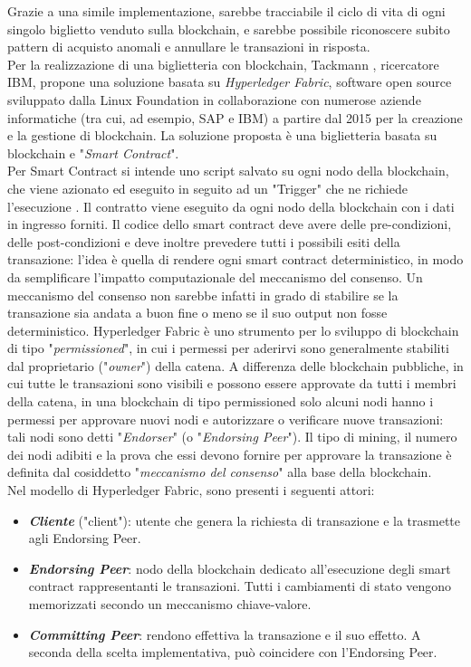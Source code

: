 Grazie a una simile implementazione, sarebbe tracciabile il ciclo di vita di ogni singolo biglietto venduto sulla blockchain, e sarebbe possibile riconoscere subito pattern di acquisto anomali e annullare le transazioni in risposta. \\
Per la realizzazione di una biglietteria con blockchain, Tackmann \cite{tackmann2017secure}, ricercatore IBM, propone una soluzione basata su \emph{Hyperledger Fabric}, software open source sviluppato dalla Linux Foundation in collaborazione con numerose aziende informatiche (tra cui, ad esempio, SAP e IBM) a partire dal 2015 per la creazione e la gestione di blockchain. La soluzione proposta è una biglietteria basata su blockchain e "\textit{Smart Contract}". \\ 
Per Smart Contract si intende uno script salvato su ogni nodo della blockchain, che viene azionato ed eseguito in seguito ad un "Trigger" che ne richiede l'esecuzione \cite{christidis2016blockchains}. Il contratto viene eseguito da ogni nodo della blockchain con i dati in ingresso forniti. Il codice dello smart contract deve avere delle pre-condizioni, delle post-condizioni e deve inoltre prevedere tutti i possibili esiti della transazione: l'idea è quella di rendere ogni smart contract deterministico, in modo da semplificare l'impatto computazionale del meccanismo del consenso. Un meccanismo del consenso non sarebbe infatti in grado di stabilire se la transazione sia andata a buon fine o meno se il suo output non fosse deterministico.
Hyperledger Fabric è uno strumento per lo sviluppo di blockchain di tipo "\textit{permissioned}", in cui i permessi per aderirvi sono generalmente stabiliti dal proprietario ("\textit{owner}") della catena. A differenza delle blockchain pubbliche, in cui tutte le transazioni sono visibili e possono essere approvate da tutti i membri della catena, in una blockchain di tipo permissioned solo alcuni nodi hanno i permessi per approvare nuovi nodi e autorizzare o verificare nuove transazioni: tali nodi sono detti "\textit{Endorser}" (o "\textit{Endorsing Peer}"). Il tipo di mining, il numero dei nodi adibiti e la prova che essi devono fornire per approvare la transazione è definita dal cosiddetto "\emph{meccanismo del consenso}" alla base della blockchain. \\
Nel modello di Hyperledger Fabric, sono presenti i seguenti attori:
\begin{itemize}
\item \emph{\textbf{Cliente}} ("client"): utente che genera la richiesta di transazione e la trasmette agli Endorsing Peer.
\item \emph{\textbf{Endorsing Peer}}: nodo della blockchain dedicato all'esecuzione degli smart contract rappresentanti le transazioni. Tutti i cambiamenti di stato vengono memorizzati secondo un meccanismo chiave-valore. 
\item \emph{\textbf{Committing Peer}}: rendono effettiva la transazione e il suo effetto. A seconda della scelta implementativa, può coincidere con l'Endorsing Peer. 
\end{itemize}
